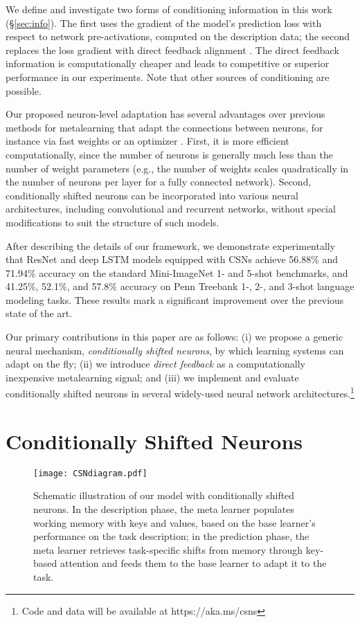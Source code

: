 \documentclass{article}
\begin{document}
We define and investigate two forms of conditioning information in this work (\S\ref{sec:info}).
The first uses the gradient of the model's prediction loss with respect to network pre-activations, computed on the description data; the second replaces the loss gradient with direct feedback alignment \cite{lillicrap2016random,nokland2016direct}.
The direct feedback information is computationally cheaper and leads to competitive or superior performance in our experiments.
Note that other sources of conditioning are possible.

Our proposed neuron-level adaptation has several advantages over previous methods for metalearning that adapt the connections between neurons, for instance via fast weights \cite{pmlr-v70-munkhdalai17a} or an optimizer \cite{finn2017model,Sachin2017}. First, it is more efficient computationally, since the number of neurons is generally much less than the number of weight parameters (e.g., the number of weights scales quadratically in the number of neurons per layer for a fully connected network).
Second, conditionally shifted neurons can be incorporated into various neural architectures, including convolutional and recurrent networks, without special modifications to suit the structure of such models.

After describing the details of our framework, we demonstrate experimentally that ResNet \cite{he2016deep} and deep LSTM \cite{hochreiter1997long} models equipped with CSNs achieve 56.88\% and 71.94\% accuracy on the standard Mini-ImageNet 1- and 5-shot benchmarks, and 41.25\%, 52.1\%, and 57.8\% accuracy on Penn Treebank 1-, 2-, and 3-shot language modeling tasks. These results mark a significant improvement over the previous state of the art.

Our primary contributions in this paper are as follows: (i) we propose a generic neural mechanism, \emph{conditionally shifted neurons}, by which learning systems can adapt on the fly; (ii) we introduce \emph{direct feedback} as a computationally inexpensive metalearning signal; and (iii) we implement and evaluate conditionally shifted neurons in several widely-used neural network architectures.\footnote{Code and data will be available at https://aka.ms/csns}

\section{Conditionally Shifted Neurons}

\begin{figure*}[ht]
\begin{center}
\texttt{[image: CSNdiagram.pdf]}
\caption{Schematic illustration of our model with conditionally shifted neurons. In the description phase, the meta learner populates working memory with keys and values, based on the base learner's performance on the task description; in the prediction phase, the meta learner retrieves task-specific shifts from memory through key-based attention and feeds them to the base learner to adapt it to the task.
}
\label{fig:adann}
\end{center}
\end{figure*}
\end{document}
